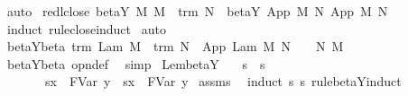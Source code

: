 \begin{isabellebody}
\isamarkupfalse%
\ auto%
\endisatagproof
{\isafoldproof}%
%
\isadelimproof
\isanewline
%
\endisadelimproof
\isanewline
{}\isamarkupfalse%
\ red{\isacharunderscore}l{\isacharunderscore}close{\isacharcolon}\ {\isachardoublequoteopen}beta{\isacharunderscore}Y{\isacharasterisk}\ M\ M{\isacharprime}\ {\isasymLongrightarrow}\ trm\ N\ {\isasymLongrightarrow}\ beta{\isacharunderscore}Y{\isacharasterisk}\ {\isacharparenleft}App\ M\ N{\isacharparenright}\ {\isacharparenleft}App\ M{\isacharprime}\ N{\isacharparenright}{\isachardoublequoteclose}\isanewline
%
\isadelimproof
%
\endisadelimproof
%
\isatagproof
{}\isamarkupfalse%
\ {\isacharparenleft}induct\ rule{\isacharcolon}close{\isachardot}induct{\isacharparenright}\isanewline
{}\isamarkupfalse%
\ auto%
\endisatagproof
{\isafoldproof}%
%
\isadelimproof
\isanewline
%
\endisadelimproof
\isanewline
{}\isamarkupfalse%
\ beta{\isacharunderscore}Y{\isacharunderscore}beta{\isacharprime}{\isacharcolon}\ {\isachardoublequoteopen}trm\ {\isacharparenleft}Lam\ M{\isacharparenright}\ {\isasymLongrightarrow}\ trm\ N\ {\isasymLongrightarrow}\ App\ {\isacharparenleft}Lam\ M{\isacharparenright}\ N\ {\isasymRightarrow}\ {\isacharbraceleft}{}\ {\isasymrightarrow}\ N{\isacharbraceright}\ M{\isachardoublequoteclose}%
\isadelimproof
\ %
\endisadelimproof
%
\isatagproof
{}\isamarkupfalse%
\ beta{\isacharunderscore}Y{\isachardot}beta\ opn{\isacharprime}{\isacharunderscore}def\ \isamarkupfalse%
\ simp%
\endisatagproof
{\isafoldproof}%
%
\isadelimproof
%
\endisadelimproof
\isanewline
\isanewline
{}\isamarkupfalse%
\ Lem{}{\isacharunderscore}{}{\isacharunderscore}{}{\isacharprime}{\isacharunderscore}beta{\isacharunderscore}Y{\isacharcolon}\isanewline
\ \ \ {\isachardoublequoteopen}s\ {\isasymRightarrow}\ s{\isacharprime}{\isachardoublequoteclose}\isanewline
\ \ \ \ \ \ \ {\isachardoublequoteopen}{\isacharparenleft}s{\isacharbrackleft}x\ {\isacharcolon}{\isacharcolon}{\isacharequal}\ FVar\ y{\isacharbrackright}{\isacharparenright}\ {\isasymRightarrow}\ {\isacharparenleft}s{\isacharprime}{\isacharbrackleft}x\ {\isacharcolon}{\isacharcolon}{\isacharequal}\ FVar\ y{\isacharbrackright}{\isacharparenright}{\isachardoublequoteclose}\isanewline
%
\isadelimproof
%
\endisadelimproof
%
\isatagproof
{}\isamarkupfalse%
\ assms\ \isamarkupfalse%
\ {\isacharparenleft}induct\ s\ s{\isacharprime}\ rule{\isacharcolon}beta{\isacharunderscore}Y{\isachardot}induct{\isacharparenright}\isanewline

\end{isabellebody}
